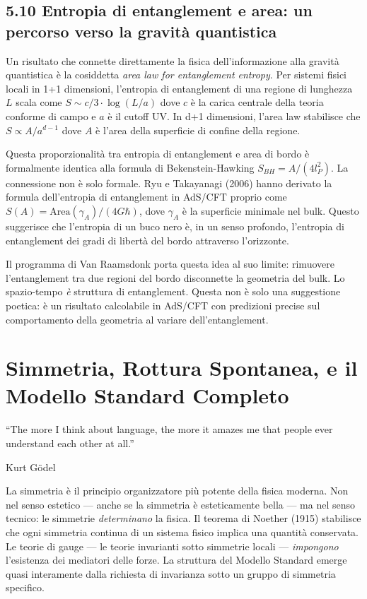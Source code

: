 \documentclass[11.5pt,a4paper,openany]{book}
\theoremstyle{remark}
\begin{document}
\section{5.10 Entropia di entanglement e area: un percorso verso la gravità quantistica}

Un risultato che connette direttamente la fisica dell'informazione alla gravità quantistica è la cosiddetta \textit{area law for entanglement entropy}. Per sistemi fisici locali in 1+1 dimensioni, l'entropia di entanglement di una regione di lunghezza $L$ scala come $S \sim c/3 \cdot \log(L/a)$ dove $c$ è la carica centrale della teoria conforme di campo e $a$ è il cutoff UV. In d+1 dimensioni, l'area law stabilisce che $S \propto A/a^{d-1}$ dove $A$ è l'area della superficie di confine della regione.

Questa proporzionalità tra entropia di entanglement e area di bordo è formalmente identica alla formula di Bekenstein-Hawking $S_{BH} = A/(4l_P^2)$. La connessione non è solo formale. Ryu e Takayanagi (2006) hanno derivato la formula dell'entropia di entanglement in AdS/CFT proprio come $S(A) = \text{Area}(\gamma_A)/(4G\hbar)$, dove $\gamma_A$ è la superficie minimale nel bulk. Questo suggerisce che l'entropia di un buco nero è, in un senso profondo, l'entropia di entanglement dei gradi di libertà del bordo attraverso l'orizzonte.

Il programma di Van Raamsdonk porta questa idea al suo limite: rimuovere l'entanglement tra due regioni del bordo disconnette la geometria del bulk. Lo spazio-tempo \textit{è} struttura di entanglement. Questa non è solo una suggestione poetica: è un risultato calcolabile in AdS/CFT con predizioni precise sul comportamento della geometria al variare dell'entanglement.

\chapter{Simmetria, Rottura Spontanea, e il Modello Standard Completo}

\epigraph{``The more I think about language, the more it amazes me that people ever understand each other at all.''}{Kurt Gödel}

La simmetria è il principio organizzatore più potente della fisica moderna. Non nel senso estetico --- anche se la simmetria è esteticamente bella --- ma nel senso tecnico: le simmetrie \textit{determinano} la fisica. Il teorema di Noether (1915) stabilisce che ogni simmetria continua di un sistema fisico implica una quantità conservata. Le teorie di gauge --- le teorie invarianti sotto simmetrie locali --- \textit{impongono} l'esistenza dei mediatori delle forze. La struttura del Modello Standard emerge quasi interamente dalla richiesta di invarianza sotto un gruppo di simmetria specifico.
\end{document}
